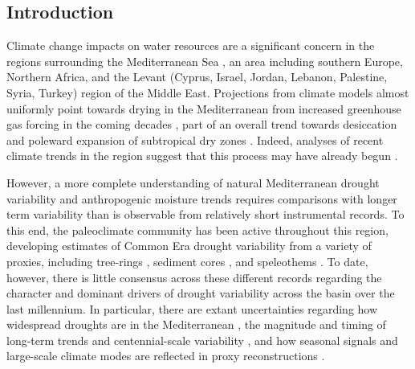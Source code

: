 \documentclass[draft,jgr]{AGUTeX}
\begin{document}
\begin{article}

\section{Introduction}
\noindent Climate change impacts on water resources are a significant concern in the regions surrounding the Mediterranean Sea \citep{Iglesias2007,GarciaRuiz2011}, an area including southern Europe, Northern Africa, and the Levant (Cyprus, Israel, Jordan, Lebanon, Palestine, Syria, Turkey) region of the Middle East. Projections from climate models almost uniformly point towards drying in the Mediterranean from increased greenhouse gas forcing in the coming decades \citep{Giorgi2008,Seager2014med}, part of an overall trend towards desiccation and poleward expansion of subtropical dry zones \citep{Held:2006,Seager2010b}. Indeed, analyses of recent climate trends in the region suggest that this process may have already begun \citep{GarciaRuiz2011,Gleick2014,Hoerling2012c,Kelley2012,Kelley2015}. 

\indent However, a more complete understanding of natural Mediterranean drought variability and anthropogenic moisture trends requires comparisons with longer term variability than is observable from relatively short instrumental records. To this end, the paleoclimate community has been active throughout this region, developing estimates of Common Era drought variability from a variety of proxies, including tree-rings \citep{Chbouki:etal1995,Glueck:Stockton2001,Touchan:etal2003,Akkemik:Aras2005,Touchan:etal2005,Esper:etal2007a,Andreu:etal2007,Nicault:etal2008,Touchan:etal2008a,Buntgen:etal2010,Touchan:etal2010a,Kose:etal2011,Touchan:etal2014a}, sediment cores \citep[e.g.,][]{Jones:etal2006,Roberts:etal2012,Moreno:etal2012}, and speleothems \citep[e.g.,][]{Jex:etal2011,Wassenburg:etal2013}. To date, however, there is little consensus across these different records regarding the character and dominant drivers of drought variability across the basin over the last millennium. In particular, there are extant uncertainties regarding how widespread droughts are in the Mediterranean \citep{Roberts:etal2012}, the magnitude and timing of long-term trends and centennial-scale variability \citep{Esper:etal2007a,Touchan:etal2010a,Wassenburg:etal2013}, and how seasonal signals and large-scale climate modes are reflected in proxy reconstructions \citep{Touchan:etal2014a,Touchan:etal2014b,Seim:etal2014}.


\end{article}
\end{document}
